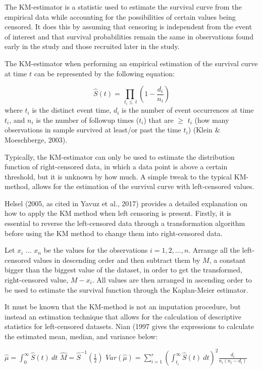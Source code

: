 \documentclass[12pt, twoside]{amherstthesis}
\begin{document}
The KM-estimator is a statistic used to estimate the survival curve from the empirical data while accounting for the possibilities of certain values being censored. It does this by assuming that censoring is independent from the event of interest and that survival probabilities remain the same in observations found early in the study and those recruited later in the study.

The KM-estimator when performing an empirical estimation of the survival curve at time \(t\) can be represented by the following equation:

\[\hat{S}(t) = \prod_{\ t_i \le \ t }\left(1-\frac{d_i}{n_i}\right)\]
where \(t_i\) is the distinct event time, \(d_i\) is the number of event occurrences at time \(t_i\), and \(n_i\) is the number of followup times (\(t_i\)) that are \(\ge\) \(t_i\) (how many observations in sample survived at least/or past the time \(t_i\)) (Klein \& Moeschberge, 2003).

Typically, the KM-estimator can only be used to estimate the distribution function of right-censored data, in which a data point is above a certain threshold, but it is unknown by how much. A simple tweak to the typical KM-method, allows for the estimation of the survival curve with left-censored values.

Helsel (2005, as cited in Yavuz et al., 2017) provides a detailed explanation on how to apply the KM method when left censoring is present. Firstly, it is essential to reverse the left-censored data through a transformation algorithm before using the KM method to change them into right-censored data.

Let \(x_i\) \(\ldots\) \(x_n\) be the values for the observations \(i = 1, 2, ..., n\). Arrange all the left-censored values in descending order and then subtract them by \(M\), a constant bigger than the biggest value of the dataset, in order to get the transformed, right-censored value, \(M-x_i\). All values are then arranged in ascending order to be used to estimate the survival function through the Kaplan-Meier estimator.

It must be known that the KM-method is not an imputation procedure, but instead an estimation technique that allows for the calculation of descriptive statistics for left-censored datasets. Nian (1997 gives the expressions to calculate the estimated mean, median, and variance below:

\(\hat{\mu} = \int_{0}^{\infty} \hat{S}(t) \ dt\)
\(\hat{M} = \hat{S}^{-1} \left (\frac{1}{2} \right)\)
\(Var(\hat{\mu}) = \sum_{i=1}^{r} \left( \int_{t_i}^{\infty}\hat{S}(t) \ dt \right)^2 \frac{d_i}{n_i(n_i - d_i)}\)
\end{document}
